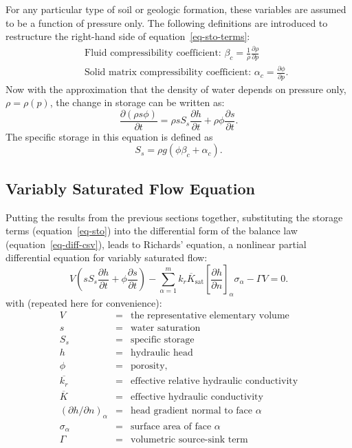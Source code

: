 \documentclass[fleqn]{article}
\begin{document}
For any particular type of soil or geologic formation, these variables
are assumed to be a function of pressure only. The following definitions
are introduced to restructure the right-hand side of
equation~\ref{eq-sto-terms}:
\begin{eqnarray*}
  &&\text{Fluid compressibility coefficient: }
  \beta_c = \frac{1}{\rho} \frac{\partial \rho}{\partial p} \\
  &&\text{Solid matrix compressibility coefficient: }
  \alpha_c = \frac{\partial \phi}{\partial p}.
\end{eqnarray*}
Now with the approximation that the density of water depends on
pressure only, $\rho = \rho(p)$, the change in storage can be written
as:
\begin{equation}
  \frac{\partial (\rho s \phi)}{\partial t} =
  \rho s S_s \frac{\partial h}{\partial t} +
  \rho \phi \frac{\partial s}{\partial t}.
  \label{eq-sto}
\end{equation}
The specific storage in this equation is defined as
\begin{equation}
  S_s = \rho g \left( \phi \beta_c + \alpha_c \right).
  \label{eq-spec-sto}
\end{equation}

\subsection{Variably Saturated Flow Equation}
Putting the results from the previous sections together,
substituting the storage terms (equation~\ref{eq-sto}) into the 
differential form of the balance law (equation~\ref{eq-diff-csv}), 
leads to Richards' equation, a nonlinear partial differential equation for 
variably saturated flow:
\begin{equation}  
  V
  \left(
  s S_s \frac{\partial h}{\partial t} + 
  \phi \frac{\partial s}{\partial t}
  \right) -
  \sum_{\alpha=1}^{m} \overline{k_r K_{\textrm{sat}}}
  \left[\frac{\partial h}{\partial n}\right]_\alpha \sigma_\alpha -
  \Gamma V = 0.
  \label{eq-unsat-flow}
\end{equation}
with (repeated here for convenience):
\begin{eqnarray*}
  V &=& \text{the representative elementary volume} \\
  s &=& \text{water saturation} \\
  S_s &=& \text{specific storage} \\
  h &=& \text{hydraulic head} \\
  \phi &=& \text{porosity}, \\
  \overline{k_r} &=& \text{effective relative hydraulic conductivity} \\
  \overline{K} &=& \text{effective hydraulic conductivity} \\
  (\partial h/\partial n)_\alpha &=& \text{head gradient normal to face $\alpha$} \\
  \sigma_\alpha &=& \text{surface area of face $\alpha$} \\
  \Gamma &=& \text{volumetric source-sink term}
\end{eqnarray*}
\end{document}
